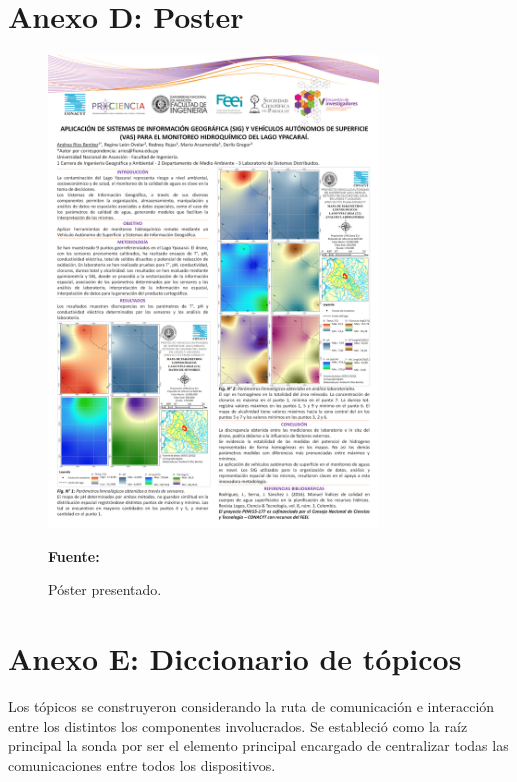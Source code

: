 \begin{appendices}
\chapter*{Anexo D: Poster}
\label{appendix: poster}
\setcounter{figure}{0}    
\begin{figure}[ht]
    \centering
    \includegraphics[width=0.78\textwidth]{Imagenes/cap5/poster-SIG-lago.png}
    \caption[Póster presentado en el V Encuentro de Investigadores 2020]{Póster presentado.}\textbf{Fuente:} \cite{noauthor_facultad_2020}
    \label{Fig:poster}
\end{figure}

\chapter*{Anexo E: Diccionario de t\'opicos}
\label{appendix: Topicos}
Los t\'opicos se construyeron considerando la ruta de comunicaci\'on e interacci\'on entre los distintos los componentes involucrados. Se estableci\'o como la ra\'iz principal la sonda por ser el elemento principal encargado de centralizar todas las comunicaciones entre todos los dispositivos.


\end{appendices}
